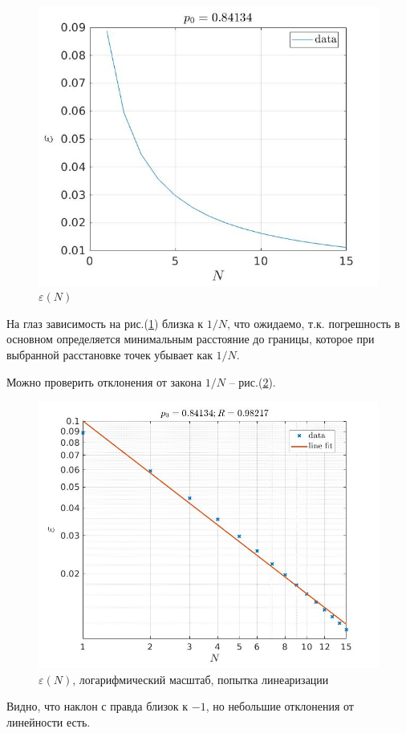 \documentclass[a4paper,12pt]{article} %
\begin{document}
\begin{figure}[h!]
\begin{center}
\includegraphics[width=1\textwidth]{./pics/linear}
\end{center}
\caption{$\varepsilon(N)$} \label{img:linear}
\end{figure}

На глаз зависимость на рис.(\ref{img:linear}) близка к $1/N$, что ожидаемо, т.к. погрешность в основном определяется минимальным расстояние до границы, которое при выбранной расстановке точек убывает как $1/N$. 

Можно проверить отклонения от закона $1/N$ -- рис.(\ref{img:log}).

\begin{figure}[h!]
\begin{center}
\includegraphics[width=1\textwidth]{./pics/log}
\end{center}
\caption{$\varepsilon(N)$, логарифмический масштаб, попытка линеаризации} \label{img:log}
\end{figure}

Видно, что наклон с правда близок к $-1$, но небольшие отклонения от линейности есть.
\end{document}
